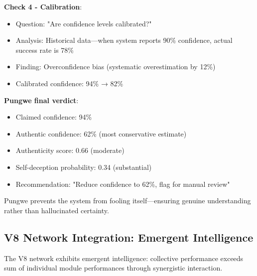 \begin{example}
\textbf{Check 4 - Calibration}:
\begin{itemize}
\item Question: "Are confidence levels calibrated?"
\item Analysis: Historical data—when system reports 90\% confidence, actual success rate is 78\%
\item Finding: Overconfidence bias (systematic overestimation by 12\%)
\item Calibrated confidence: 94\% → 82\%
\end{itemize}

\textbf{Pungwe final verdict}:
\begin{itemize}
\item Claimed confidence: 94\%
\item Authentic confidence: 62\% (most conservative estimate)
\item Authenticity score: 0.66 (moderate)
\item Self-deception probability: 0.34 (substantial)
\item Recommendation: "Reduce confidence to 62\%, flag for manual review"
\end{itemize}

Pungwe prevents the system from fooling itself—ensuring genuine understanding rather than hallucinated certainty.
\end{example}

\subsection{V8 Network Integration: Emergent Intelligence}

\begin{theorem}
\label{thm:v8_emergence}
The V8 network exhibits emergent intelligence: collective performance exceeds sum of individual module performances through synergistic interaction.
\end{theorem}

